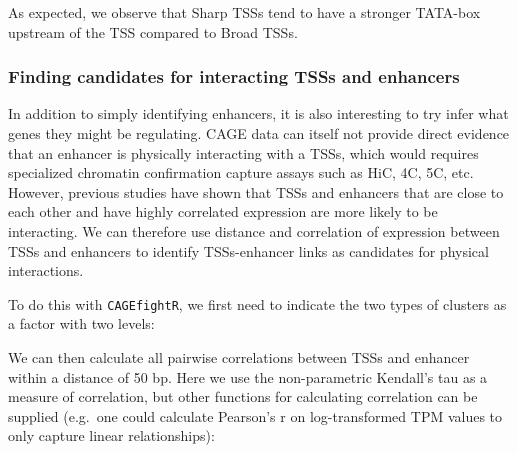 \documentclass[9pt,a4paper,]{extarticle}
\newenvironment{Shaded}{\begin{snugshade}}{\end{snugshade}}
\newcommand{\KeywordTok}[1]{\textcolor[rgb]{0.13,0.29,0.53}{\textbf{{#1}}}}
\newcommand{\DataTypeTok}[1]{\textcolor[rgb]{0.13,0.29,0.53}{{#1}}}
\newcommand{\StringTok}[1]{\textcolor[rgb]{0.31,0.60,0.02}{{#1}}}
\newcommand{\NormalTok}[1]{{#1}}
\begin{document}
As expected, we observe that Sharp TSSs tend to have a stronger TATA-box upstream of the TSS compared to Broad TSSs.

\subsubsection{Finding candidates for interacting TSSs and enhancers}\label{finding-candidates-for-interacting-tsss-and-enhancers}

In addition to simply identifying enhancers, it is also interesting to try infer what genes they might be regulating. CAGE data can itself not provide direct evidence that an enhancer is physically interacting with a TSSs, which would requires specialized chromatin confirmation capture assays such as HiC, 4C, 5C, etc. However, previous studies have shown that TSSs and enhancers that are close to each other and have highly correlated expression are more likely to be interacting. We can therefore use distance and correlation of expression between TSSs and enhancers to identify TSSs-enhancer links as candidates for physical interactions\citep{Andersson2014b}.

To do this with \texttt{CAGEfightR}, we first need to indicate the two types of clusters as a factor with two levels:

\begin{Shaded}
\end{Shaded}

We can then calculate all pairwise correlations between TSSs and enhancer within a distance of 50 bp. Here we use the non-parametric Kendall's tau as a measure of correlation, but other functions for calculating correlation can be supplied (e.g.~one could calculate Pearson's r on log-transformed TPM values to only capture linear relationships):

\begin{Shaded}
\end{Shaded}
\end{document}

